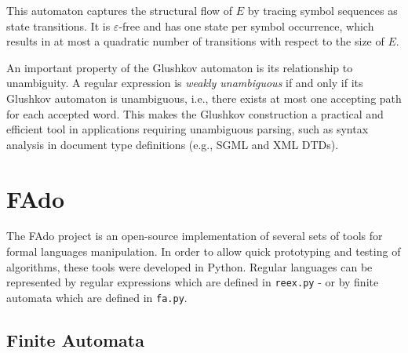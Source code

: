 This automaton captures the structural flow of $E$ by tracing symbol sequences as state transitions. It is $\varepsilon$-free and has one state per symbol occurrence, which results in at most a quadratic number of transitions with respect to the size of $E$.

An important property of the Glushkov automaton is its relationship to unambiguity. A regular expression is \emph{weakly unambiguous} if and only if its Glushkov automaton is unambiguous, i.e., there exists at most one accepting path for each accepted word. This makes the Glushkov construction a practical and efficient tool in applications requiring unambiguous parsing, such as syntax analysis in document type definitions (e.g., SGML and XML DTDs).





\section{FAdo}
The FAdo \cite{fado_paper} project is an open-source implementation of several sets of tools for formal languages manipulation. In order to allow quick prototyping and testing of algorithms, these tools were developed in Python. Regular languages can be represented by regular expressions which are defined in \texttt{reex.py} - or by finite automata which are defined in \texttt{fa.py}.

\subsection{Finite Automata}

